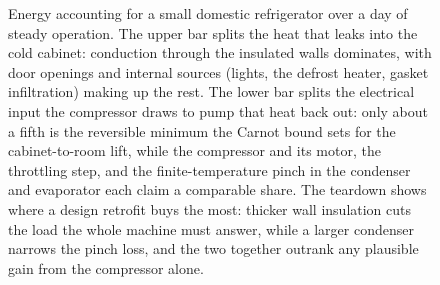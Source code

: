 \begin{figure}[htbp]
\centering
{}
\caption[Domestic-refrigerator energy accounting]{Energy accounting for a small
domestic refrigerator over a day of steady operation. The upper bar splits the
heat that leaks into the cold cabinet: conduction through the insulated walls
dominates, with door openings and internal sources (lights, the defrost heater,
gasket infiltration) making up the rest. The lower bar splits the electrical
input the compressor draws to pump that heat back out: only about a fifth is the
reversible minimum the Carnot bound sets for the cabinet-to-room lift, while the
compressor and its motor, the throttling step, and the finite-temperature pinch
in the condenser and evaporator each claim a comparable share. The teardown
shows where a design retrofit buys the most: thicker wall insulation cuts the
load the whole machine must answer, while a larger condenser narrows the pinch
loss, and the two together outrank any plausible gain from the compressor alone.}
\label{fig:vol04ch03:fridge-teardown}
\end{figure}
